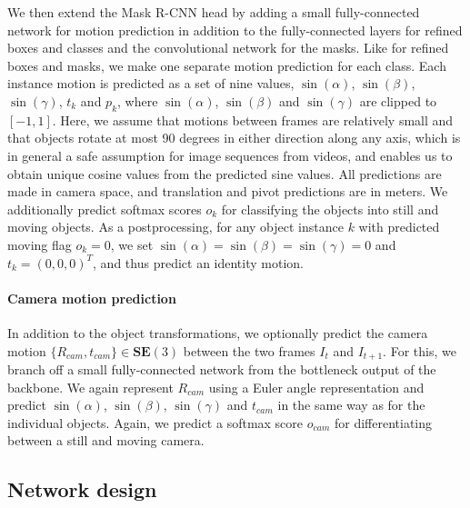 We then extend the Mask R-CNN head by adding a small fully-connected network for motion
prediction in addition to the fully-connected layers for
refined boxes and classes and the convolutional network for the masks.
Like for refined boxes and masks, we make one separate motion prediction for each class.
Each instance motion is predicted as a set of nine values,
$\sin(\alpha)$, $\sin(\beta)$, $\sin(\gamma)$, $t_k$ and $p_k$,
where $\sin(\alpha)$, $\sin(\beta)$ and $\sin(\gamma)$ are clipped to $[-1, 1]$.
Here, we assume that motions between frames are relatively small
and that objects rotate at most 90 degrees in either direction along any axis,
which is in general a safe assumption for image sequences from videos,
and enables us to obtain unique cosine values from the predicted sine values.
All predictions are made in camera space, and translation and pivot predictions are in meters.
We additionally predict softmax scores $o_k$ for classifying the objects into
still and moving objects. As a postprocessing, for any object instance $k$ with predicted moving flag $o_k = 0$,
we set $\sin(\alpha) = \sin(\beta) = \sin(\gamma) = 0$ and $t_k = (0,0,0)^T$,
and thus predict an identity motion.


\paragraph{Camera motion prediction}
In addition to the object transformations, we optionally predict the camera motion $\{R_{cam}, t_{cam}\}\in \mathbf{SE}(3)$
between the two frames $I_t$ and $I_{t+1}$.
For this, we branch off a small fully-connected network from the bottleneck output of the backbone.
We again represent $R_{cam}$ using a Euler angle representation and
predict $\sin(\alpha)$, $\sin(\beta)$, $\sin(\gamma)$ and $t_{cam}$ in the same way as for the individual objects.
Again, we predict a softmax score $o_{cam}$ for differentiating between
a still and moving camera.

\subsection{Network design}

\label{ssec:design}
